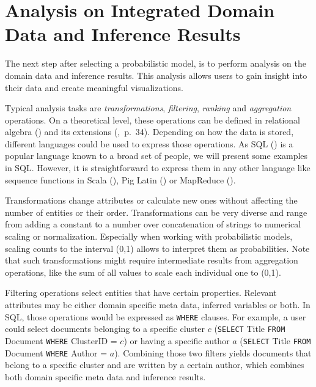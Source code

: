 \section{Analysis on Integrated Domain Data and Inference Results}

The next step after selecting a probabilistic model, is to perform analysis on the domain data and inference results. This analysis allows users to gain insight into their data and create meaningful visualizations.

Typical analysis tasks are \emph{transformations}, \emph{filtering}, \emph{ranking} and \emph{aggregation} operations. On a theoretical level, these operations can be defined in relational algebra (\cite{ozsoyouglu1987extending, klug1982equivalence}) and its extensions (\cite{rajaraman2011mining},~p.~34). Depending on how the data is stored, different languages could be used to express those operations. As SQL (\cite{iso2011sql}) is a popular language known to a broad set of people, we will present some examples in SQL. However, it is straightforward to express them in any other language like sequence functions in Scala (\cite{odersky2008programming}), Pig Latin (\cite{gates2011programming}) or MapReduce (\cite{dean2008mapreduce}).

Transformations change attributes or calculate new ones without affecting the number of entities or their order. Transformations can be very diverse and range from adding a constant to a number over concatenation of strings to numerical scaling or normalization. Especially when working with probabilistic models, scaling counts to the interval (0,1) allows to interpret them as probabilities. Note that such transformations might require intermediate results from aggregation operations, like the sum of all values to scale each individual one to (0,1).

Filtering operations select entities that have certain properties. Relevant attributes may be either domain specific meta data, inferred variables or both. In SQL, those operations would be expressed as \texttt{WHERE} clauses. For example, a user could select documents belonging to a specific cluster $c$ (\texttt{SELECT} Title \texttt{FROM} Document \texttt{WHERE} ClusterID = $c$) or having a specific author $a$ (\texttt{SELECT} Title \texttt{FROM} Document \texttt{WHERE} Author = $a$). Combining those two filters yields documents that belong to a specific cluster and are written by a certain author, which combines both domain specific meta data and inference results.


